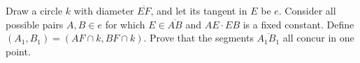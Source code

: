 Draw a circle $k$ with diameter $\overline{EF}$, and let its tangent in $E$ be $e$. Consider all possible pairs $A,B\in e$ for which $E\in \overline{AB}$ and $AE\cdot EB$ is a fixed constant. Define $(A_1,B_1)=(AF\cap k,BF\cap k)$. Prove that the segments $\overline{A_1B_1}$ all concur in one point.